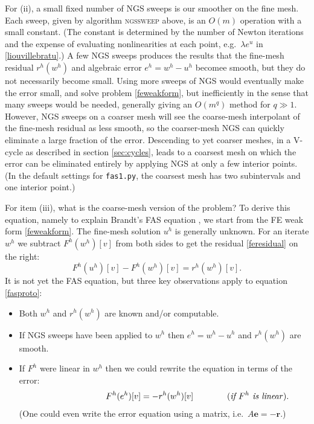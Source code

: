 \documentclass[letterpaper,final,12pt,reqno]{amsart}
\newcommand{\be}{\mathbf{e}}
\newcommand{\br}{\mathbf{r}}
\begin{document}
For (ii), a small fixed number of NGS sweeps is our smoother on the fine mesh.  Each sweep, given by algorithm \textsc{ngssweep} above, is an $O(m)$ operation with a small constant.  (The constant is determined by the number of Newton iterations and the expense of evaluating nonlinearities at each point, e.g.~$\lambda e^u$ in \eqref{liouvillebratu}.)  A few NGS sweeps produces the results that the fine-mesh residual $r^h(w^h)$ and algebraic error $e^h = w^h - u^h$ becomee smooth, but they do not necessarily become small.  Using more sweeps of NGS would eventually make the error small, and solve problem \eqref{feweakform}, but inefficiently in the sense that many sweeps would be needed, generally giving an $O(m^q)$ method for $q\gg 1$.  However, NGS sweeps on a coarser mesh will see the coarse-mesh interpolant of the fine-mesh residual as less smooth, so the coarser-mesh NGS can quickly eliminate a large fraction of the error.  Descending to yet coarser meshes, in a V-cycle as described in section \ref{sec:cycles}, leads to a coarsest mesh on which the error can be eliminated entirely by applying NGS at only a few interior points.  (In the default settings for \texttt{fas1.py}, the coarsest mesh has two subintervals and one interior point.)

For item (iii), what is the coarse-mesh version of the problem?  To derive this equation, namely to explain Brandt's FAS equation \cite{Brandt1977}, we start from the FE weak form \eqref{feweakform}.  The fine-mesh solution $u^h$ is generally unknown.  For an iterate $w^h$ we subtract $F^h(w^h)[v]$ from both sides to get the residual \eqref{feresidual} on the right:
\begin{equation}
  F^h(u^h)[v] - F^h(w^h)[v] = r^h(w^h)[v]. \label{fasproto}
\end{equation}
It is not yet the FAS equation, but three key observations apply to equation \eqref{fasproto}:
\begin{itemize}
\item Both $w^h$ and $r^h(w^h)$ are known and/or computable.
\item If NGS sweeps have been applied to $w^h$ then $e^h=w^h-u^h$ and $r^h(w^h)$ are smooth.
\item If $F^h$ were linear in $w^h$ then we could rewrite the equation in terms of the error:
    $$\qquad\qquad\qquad\qquad F^h(e^h)[v] = -r^h(w^h)[v] \qquad\qquad (\text{\emph{if $F^h$ is linear}}).$$
(One could even write the error equation using a matrix, i.e.~$A\be=-\br$.)
\end{itemize}
\end{document}

